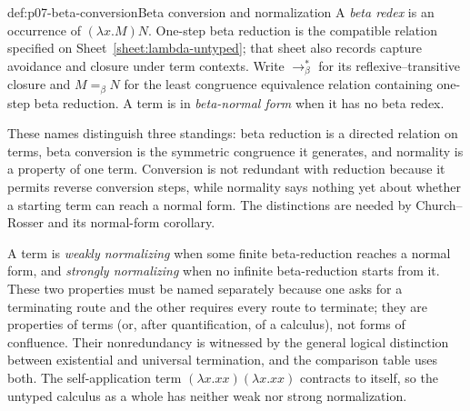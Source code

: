 \begin{hbdefinition}{def:p07-beta-conversion}{Beta conversion and normalization}
A \emph{beta redex} is an occurrence of \((\lambda x.M)N\).  One-step beta
reduction is the compatible relation specified on
Sheet~\ref{sheet:lambda-untyped}; that sheet also records capture avoidance and
closure under term contexts.  Write
\(\longrightarrow_{\beta}^{*}\) for its reflexive--transitive closure and
\(M=_{\beta}N\) for the least congruence equivalence relation containing
one-step beta reduction.  A term is in \emph{beta-normal form} when it has no
beta redex.

These names distinguish three standings: beta reduction is a directed
relation on terms, beta conversion is the symmetric congruence it generates,
and normality is a property of one term.  Conversion is not redundant with
reduction because it permits reverse conversion steps, while normality says
nothing yet about whether a starting term can reach a normal form.  The
distinctions are needed by Church--Rosser and its normal-form corollary.

A term is \emph{weakly normalizing} when some finite beta-reduction reaches a
normal form, and \emph{strongly normalizing} when no infinite beta-reduction
starts from it.  These two properties must be named separately because one
asks for a terminating route and the other requires every route to terminate;
they are properties of terms (or, after quantification, of a calculus), not
forms of confluence.  Their nonredundancy is witnessed by the general logical
distinction between existential and universal termination, and the comparison
table uses both.  The self-application term
\((\lambda x.xx)(\lambda x.xx)\) contracts to itself, so the untyped calculus
as a whole has neither weak nor strong normalization.
\end{hbdefinition}

